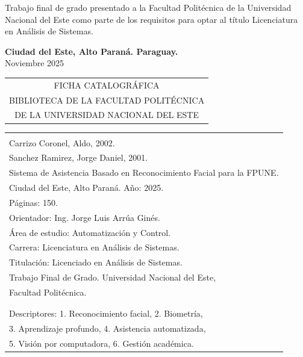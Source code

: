 Trabajo final de grado presentado a la Facultad Politécnica de la Universidad Nacional del Este como parte de los requisitos para optar al título Licenciatura en Análisis de Sistemas.

\vspace{1.0cm}
\begin{center}
{\large \textbf{Ciudad del Este, Alto Paraná. Paraguay.}\\[3mm]
Noviembre 2025}
\end{center}

\newpage \normalsize
\thispagestyle{empty}
\begin{center} 
\begin{tabular}{c} 
  FICHA CATALOGRÁFICA \\
  BIBLIOTECA DE LA FACULTAD POLITÉCNICA \\
  DE LA UNIVERSIDAD NACIONAL DEL ESTE \\
\end{tabular} %
\vspace{0.3cm}

\begin{tabular}{|l|} \hline %
\\
Carrizo Coronel, Aldo, 2002.\\
Sanchez Ramirez, Jorge Daniel, 2001.\\
Sistema de Asistencia Basado en Reconocimiento Facial para la FPUNE.\\
Ciudad del Este, Alto Paraná. Año: 2025.\\
Páginas: 150.\\

Orientador: Ing. Jorge Luis Arrúa Ginés.\\
Área de estudio: Automatización y Control.\\[1em]

Carrera: Licenciatura en Análisis de Sistemas.\\
Titulación: Licenciado en Análisis de Sistemas.\\
Trabajo Final de Grado. Universidad Nacional del Este,\\
Facultad Politécnica.\\
\\ \\

Descriptores: 1. Reconocimiento facial, 2. Biometría,
\\ \hspace{2cm} 3. Aprendizaje profundo, 4. Asistencia automatizada,
\\ \hspace{2cm} 5. Visión por computadora, 6. Gestión académica.\\


\end{tabular}
\end{center}
